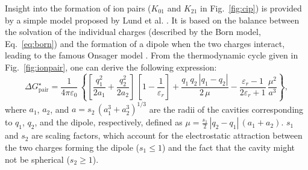 \documentclass[review,preprint]{elsarticle}
\begin{document}
Insight into the formation of ion pairs ($K_{01}$ and $K_{21}$ in Fig.~\ref{fig:cip}) is provided by a simple model proposed by Lund et al. \cite{lundDielectricInterpretationSpecificity2010}. It is based on the balance between the solvation of the individual charges (described by the Born model, Eq.~\eqref{eq:born}) and the formation of a dipole when the two charges interact, leading to the famous Onsager model \cite{onsagerElectricMomentsMolecules1936,krishtalikElectrostaticIonSolvent1991,aubretUnderstandingLocalField2019}. From the thermodynamic cycle given in Fig.~\ref{fig:ionpair}, one can derive the following expression: \begin{equation}
	\Delta G_{\text{pair}}^\star = \frac{1}{4\pi\varepsilon_0}\,\left\{\left[\frac{q_1^2}{2a_1}+\frac{q_2^2}{2a_2}\right]\,\left[1-\frac{1}{\varepsilon_r}\right]+\frac{q_1\,q_2\,|q_1-q_2|}{2\,\mu}-\frac{\varepsilon_r-1}{2\varepsilon_r+1}\,\frac{\mu^2}{a^3}\right\},\label{eq:pair}
\end{equation}
where $a_1$, $a_2$, and $a=s_2\,( a_1^3+a_2^3)^{1/3}$ are the radii of the cavities corresponding to $q_1$, $q_2$, and the dipole, respectively, defined as $\mu = \frac{s_1}{2}\,|q_2-q_1|\,(a_1+a_2)$.  $s_1$ and $s_2$ are scaling factors, which account for the electrostatic attraction between the two charges forming the dipole ($s_1\leq 1$) and the fact that the cavity might not be spherical ($s_2\geq 1$).
\end{document}
